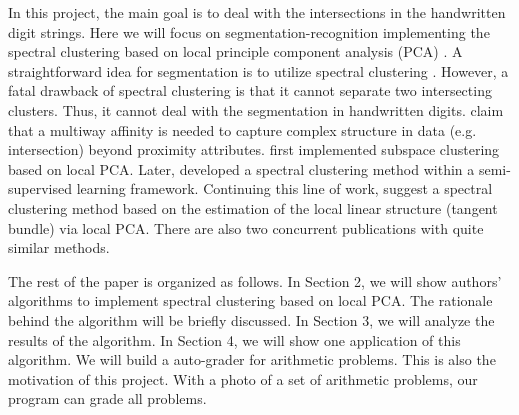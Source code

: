 In this project, the main goal is to deal with the intersections in the handwritten digit strings.
Here we will focus on segmentation-recognition implementing the spectral clustering based on local principle component analysis (PCA) \citep{arias2017}.
A straightforward idea for segmentation is to utilize spectral clustering \citep{ng2002}.
However, a fatal drawback of spectral clustering is that it cannot separate two intersecting clusters.
Thus, it cannot deal with the segmentation in handwritten digits.
\citet{shashua2006} claim that a multiway affinity is needed to capture complex structure in data (e.g. intersection) beyond proximity attributes.
\citet{fan2006} first implemented subspace clustering based on local PCA.
Later, \citet{goldberg2009} developed a spectral clustering method within a semi-supervised learning framework.
Continuing this line of work, \citep{arias2011} suggest a spectral clustering method based on the estimation of the local linear structure (tangent bundle) via local PCA.
There are also two concurrent publications \citep{wang2011, gong2012} with quite similar methods.

The rest of the paper is organized as follows.
In Section 2, we will show authors' algorithms to implement spectral clustering based on local PCA.
The rationale behind the algorithm will be briefly discussed.
In Section 3, we will analyze the results of the algorithm.
In Section 4, we will show one application of this algorithm.
We will build a auto-grader for arithmetic problems.
This is also the motivation of this project.
With a photo of a set of arithmetic problems, our program can grade all problems.  

